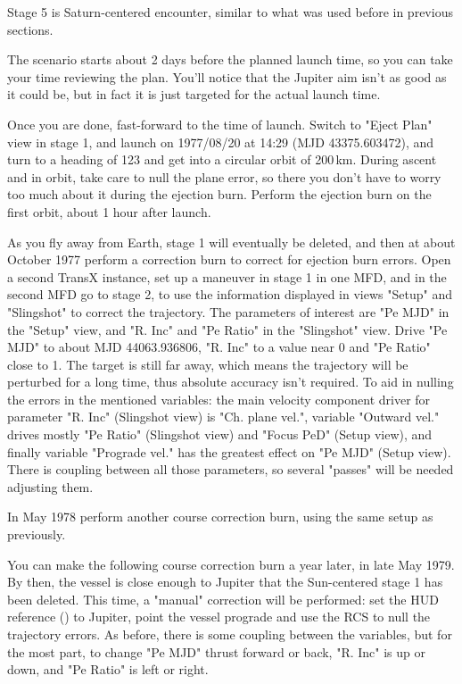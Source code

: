 \documentclass[Orbiter User Manual.tex]{subfiles}
\begin{document}
Stage 5 is Saturn-centered encounter, similar to what was used before in
previous sections.

The scenario starts about 2 days before the planned launch time, so you can take
your time reviewing the plan. You'll notice that the Jupiter aim isn't as good
as it could be, but in fact it is just targeted for the actual launch time.

Once you are done, fast-forward to the time of launch. Switch to "Eject Plan"
view in stage 1, and launch on 1977/08/20 at 14:29 (MJD 43375.603472), and turn
to a heading of 123\deg{} and get into a circular orbit of 200\,km. During
ascent and in orbit, take care to null the plane error, so there you don't have
to worry too much about it during the ejection burn. Perform the ejection burn
on the first orbit, about 1 hour after launch.

As you fly away from Earth, stage 1 will eventually be deleted, and then at
about October 1977 perform a correction burn to correct for ejection burn
errors. Open a second TransX instance, set up a maneuver in stage 1 in one MFD,
and in the second MFD go to stage 2, to use the information displayed in views
"Setup" and "Slingshot" to correct the trajectory. The parameters of interest
are "Pe MJD" in the "Setup" view, and "R. Inc" and "Pe Ratio" in the "Slingshot"
view. Drive "Pe MJD" to about MJD 44063.936806, "R. Inc" to a value near 0 and
"Pe Ratio" close to 1. The target is still far away, which means the trajectory
will be perturbed for a long time, thus absolute accuracy isn't required. To aid
in nulling the errors in the mentioned variables: the main velocity component
driver for parameter "R. Inc" (Slingshot view) is "Ch. plane vel.", variable
"Outward vel." drives mostly "Pe Ratio" (Slingshot view) and "Focus PeD" (Setup
view), and finally variable "Prograde vel." has the greatest effect on "Pe MJD"
(Setup view). There is coupling between all those parameters, so several
"passes" will be needed adjusting them.

In May 1978 perform another course correction burn, using the same setup as
previously.

You can make the following course correction burn a year later, in late May
1979. By then, the vessel is close enough to Jupiter that the Sun-centered stage
1 has been deleted. This time, a "manual" correction will be performed: set the
HUD reference () to Jupiter, point the vessel prograde and
use the RCS to null the trajectory errors.
As before, there is some coupling between the variables, but for the most part,
to change "Pe MJD" thrust forward or back, "R. Inc" is up or down, and "Pe
Ratio" is left or right.
\end{document}
